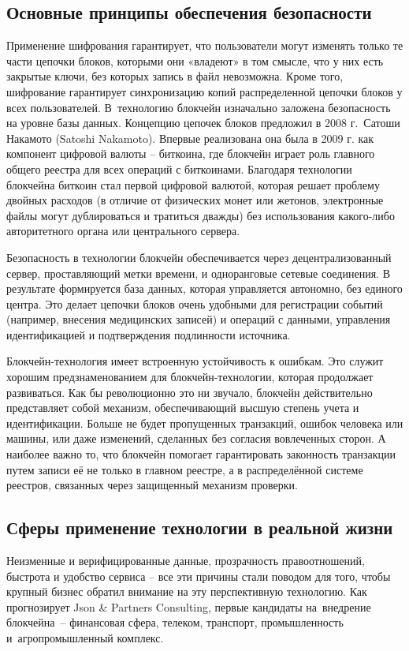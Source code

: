 \documentclass[och, master, nir]{SCWorks_fix}
\theoremstyle{plain}
\theoremstyle{plain}
\theoremstyle{plain}
\theoremstyle{definition}
\begin{document}
\subsection{Основные принципы обеспечения безопасности}

Применение шифрования гарантирует, что пользователи могут изменять только те части цепочки блоков, которыми они «владеют» в том смысле, что у них есть закрытые ключи, без которых запись в файл невозможна. Кроме того, шифрование гарантирует синхронизацию копий распределенной цепочки блоков у всех пользователей. В технологию блокчейн изначально заложена безопасность на уровне базы данных. Концепцию цепочек блоков предложил в 2008 г. Сатоши Накамото (Satoshi Nakamoto). Впервые реализована она была в 2009 г. как компонент цифровой валюты – биткоина, где блокчейн играет роль главного общего реестра для всех операций с биткоинами. Благодаря технологии блокчейна биткоин стал первой цифровой валютой, которая решает проблему двойных расходов (в отличие от физических монет или жетонов, электронные файлы могут дублироваться и тратиться дважды) без использования какого-либо авторитетного органа или центрального сервера.

Безопасность в технологии блокчейн обеспечивается через децентрализованный сервер, проставляющий метки времени, и одноранговые сетевые соединения. В результате формируется база данных, которая управляется автономно, без единого центра. Это делает цепочки блоков очень удобными для регистрации событий (например, внесения медицинских записей) и операций с данными, управления идентификацией и подтверждения подлинности источника.

Блокчейн-технология имеет встроенную устойчивость к ошибкам. Это служит хорошим предзнаменованием для блокчейн-технологии, которая продолжает развиваться. Как бы революционно это ни звучало, блокчейн действительно представляет собой механизм, обеспечивающий высшую степень учета и идентификации. Больше не будет пропущенных транзакций, ошибок человека или машины, или даже изменений, сделанных без согласия вовлеченных сторон. А наиболее важно то, что блокчейн помогает гарантировать законность транзакции путем записи её не только в главном реестре, а в распределённой системе реестров, связанных через защищенный механизм проверки.

\subsection{Сферы применение технологии в реальной жизни}
Неизменные и верифицированные данные, прозрачность правоотношений, быстрота и удобство сервиса – все эти причины стали поводом для того, чтобы крупный бизнес обратил внимание на эту перспективную технологию. Как прогнозирует Json & Partners Consulting, первые кандидаты на внедрение блокчейна – финансовая сфера, телеком, транспорт, промышленность и агропромышленный комплекс.
\end{document}
